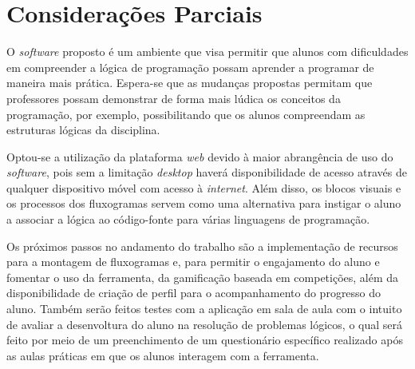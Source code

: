 \documentclass[12pt]{article}
\begin{document}
\section{Considerações Parciais}
O \textit{software} proposto é um ambiente que visa permitir que alunos com dificuldades em compreender a lógica de programação possam aprender a programar de maneira mais prática. Espera-se que as mudanças propostas permitam que professores possam demonstrar de forma mais lúdica os conceitos da programação, por exemplo, possibilitando que os alunos compreendam as estruturas lógicas da disciplina.
\par Optou-se a utilização da plataforma \textit{web} devido à maior abrangência de uso do \textit{software}, pois sem a limitação \textit{desktop} haverá disponibilidade de acesso através de qualquer dispositivo móvel com acesso à \textit{internet}. Além disso, os blocos visuais e os processos dos fluxogramas servem como uma alternativa para instigar o aluno a associar a lógica ao código-fonte para várias linguagens de programação. 
\par Os próximos passos no andamento do trabalho são a implementação de recursos para a montagem de fluxogramas e, para permitir o engajamento do aluno e fomentar o uso da ferramenta, da gamificação baseada em competições, além da disponibilidade de criação de perfil para o acompanhamento do progresso do aluno. Também serão feitos testes com a aplicação em sala de aula com o intuito de avaliar a desenvoltura do aluno na resolução de problemas lógicos, o qual será feito por meio de um preenchimento de um questionário específico realizado após as aulas práticas em que os alunos interagem com a ferramenta.



\end{document}

